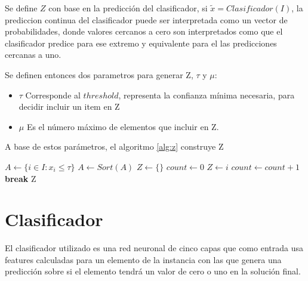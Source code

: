 \documentclass[spanish, a4paper, 12pt, twoside, openany,final]{book}
\numberwithin{equation}{section}
\begin{document}
Se define $Z$ con base en la predicción del clasificador, si $\tilde{x} = Clasificador(I)$, la prediccion continua del clasificador puede ser interpretada como un vector de probabilidades, donde valores cercanos a cero son interpretados como que el clasificador predice para ese extremo y equivalente para el las predicciones cercanas a uno.

Se definen entonces dos parametros para generar Z, $\tau$ y $\mu$:

\begin{itemize}
	\item $\tau$ Corresponde al $threshold$, representa la confianza mínima necesaria, para decidir incluir un item en Z
	\item $\mu$ Es el número máximo de elementos que incluir en Z.
\end{itemize}

A base de estos parámetros, el algoritmo \ref{alg:z} construye Z

\begin{algorithm}[H]
	\caption{$Z(\tilde{x},\tau,\mu)$}\label{alg:z}
	\begin{algorithmic}
		\State $A \gets \{ i \in I: x_i \leq \tau \}$
		\State $A \gets Sort(A)$  
		\State $Z \gets \{\}$	  
		\State $count \gets 0$
				  
			\State $Z \gets i$
			\State $count \gets count + 1$
				\State \textbf{break}
			\EndIf
		\EndFor
		\State Z
	\end{algorithmic}
\end{algorithm}


\section{Clasificador}

El clasificador utilizado es una red neuronal de cinco capas que como entrada usa features calculadas para un elemento de la instancia con las que genera una predicción sobre si el elemento tendrá un valor de cero o uno en la solución final.
\end{document}
